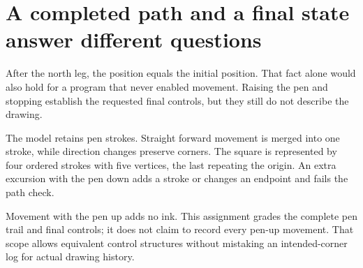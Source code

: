\section{A completed path and a final state answer different
  questions}\label{006-marsbot-square-p09-a-completed-path-and-a-final-state-answer-different-questions}

After the north leg, the position equals the initial position. That fact
alone would also hold for a program that never enabled movement. Raising
the pen and stopping establish the requested final controls, but they
still do not describe the drawing.

The model retains pen strokes. Straight forward movement is merged into
one stroke, while direction changes preserve corners. The square is
represented by four ordered strokes with five vertices, the last
repeating the origin. An extra excursion with the pen down adds a stroke
or changes an endpoint and fails the path check.

Movement with the pen up adds no ink. This assignment grades the
complete pen trail and final controls; it does not claim to record every
pen-up movement. That scope allows equivalent control structures without
mistaking an intended-corner log for actual drawing history.

